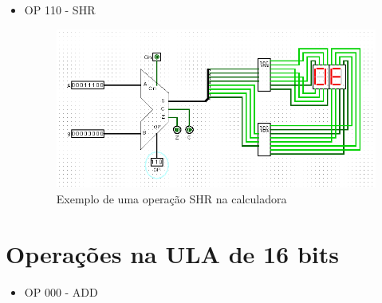\documentclass[
	12pt,				%
	openright,			%
	twoside,			%
	a4paper,			%
	english,			%
	french,				%
	spanish,			%
	brazil,				%
	]{abntex2}
\begin{document}
\begin{apendicesenv}
\begin{itemize}
\newpage
\item{OP 110 - SHR}

\begin{figure}[H]
	\begin{center}
	    \includegraphics[scale=0.55]{imagens/calc110shr.png}
	\end{center}
\caption{\label{calc110shr}Exemplo de uma operação SHR na calculadora}
\end{figure}

\end{itemize}

\newpage

\section{Operações na ULA de 16 bits}

\begin{itemize}
\item {OP 000 - ADD}


\end{itemize}
\end{apendicesenv}
\end{document}
